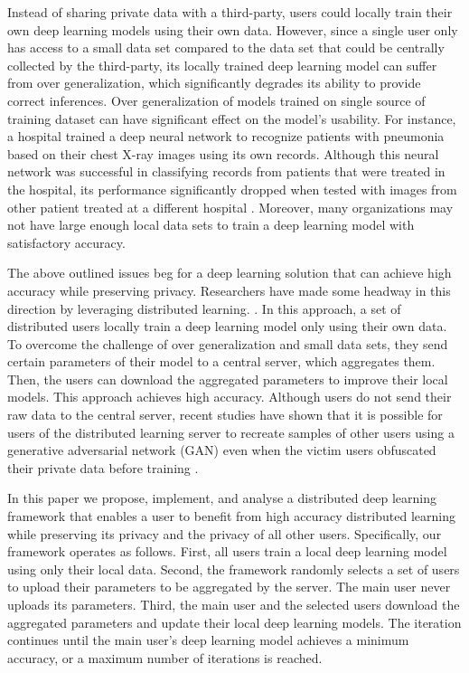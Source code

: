 \documentclass[conference]{IEEEtran}
\begin{document}
Instead of sharing private data with a third-party, users could locally train their own deep learning models using their own
data. However, since a single user only has access to a small data set compared to the data set that could be centrally
collected by the third-party, its locally trained deep learning model can suffer from over generalization, which significantly
degrades its ability to provide correct inferences. 
Over generalization of models trained on single source of training dataset can have significant
effect on the model's usability. 
For instance, a hospital trained a deep neural network to recognize patients with pneumonia based on their
chest X-ray images using its own records. Although this neural network was successful in classifying records from patients that were
treated in the hospital, its performance significantly dropped when tested with images from other patient treated at a different
hospital \cite{zech2018variable}. 
Moreover, many organizations may not have large enough local data sets to train a deep learning model with satisfactory
accuracy. 
 
The above outlined issues beg for a deep learning solution that can achieve high accuracy while preserving privacy. 
Researchers have made some headway in this direction by leveraging distributed learning. 
\cite{shokri2015privacy}.
In this approach, a set of distributed users locally
train a deep learning model only using their own data. To overcome the challenge of over generalization and small
data sets, they send certain parameters of their model to a central server, which aggregates them. 
Then, the users can download the aggregated parameters to improve their local models. This approach achieves high accuracy.
Although users do not send their raw data to the central server, recent studies have shown that it is possible for users of the
distributed learning server to recreate samples of other users using a generative adversarial network (GAN) even when the victim users 
obfuscated their private data before training \cite{hitaj2017deep}.

In this paper we propose, implement, and analyse a distributed deep learning framework that enables a user to benefit from 
high accuracy distributed learning while preserving its privacy and the privacy of all other users. 
Specifically, our framework operates as follows. First, all users train a local deep learning model using only their local data.
Second, the framework randomly selects a set of users to upload their parameters to be aggregated by the server. The main user
never uploads its parameters. Third, the main user and the selected users download the aggregated parameters and update their local
deep learning models. The iteration continues until the main user's deep learning model achieves a minimum
accuracy, or a maximum number of iterations is reached.
\end{document}
